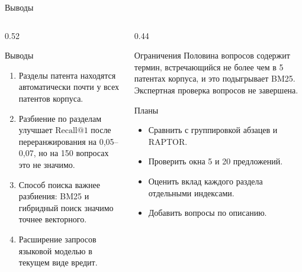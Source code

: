 \documentclass[aspectratio=169]{beamer}
\makeatletter
\newcommand{\Rk}[1]{\mathrm{Recall@}#1}
\makeatother
\begin{document}
\begin{frame}{Выводы}
    \footnotesize
    \begin{columns}[T]
        \begin{column}{0.52\textwidth}
            \begin{exampleblock}{Выводы}
                \begin{enumerate}[1)]
                    \item Разделы патента находятся автоматически почти у всех патентов корпуса.
                    \item Разбиение по разделам улучшает $\Rk{1}$ после переранжирования на 0,05--0,07, но на 150 вопросах это не значимо.
                    \item Способ поиска важнее разбиения: BM25 и гибридный поиск значимо точнее векторного.
                    \item Расширение запросов языковой моделью в текущем виде вредит.
                \end{enumerate}
            \end{exampleblock}
        \end{column}
        \begin{column}{0.44\textwidth}
            \begin{alertblock}{Ограничения}
                Половина вопросов содержит термин, встречающийся не более чем в 5 патентах корпуса, и это подыгрывает BM25.
                Экспертная проверка вопросов не завершена.
            \end{alertblock}
            \begin{block}{Планы}
                \begin{itemize}
                    \item Сравнить с группировкой абзацев и RAPTOR.
                    \item Проверить окна 5 и 20 предложений.
                    \item Оценить вклад каждого раздела отдельными индексами.
                    \item Добавить вопросы по описанию.
                \end{itemize}
            \end{block}
        \end{column}
    \end{columns}
\end{frame}
\end{document}
